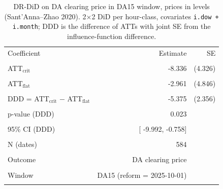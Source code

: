 \begin{table}[H]\centering\small
\caption{DR-DiD on DA clearing price in DA15 window, prices in levels (Sant'Anna--Zhao 2020). 2$\times$2 DiD per hour-class, covariates \texttt{i.dow + i.month}; DDD is the difference of ATTs with joint SE from the influence-function difference.}\label{tab:reform_csdid_da15_da}
\begin{tabular}{lrr}
\toprule
Coefficient & Estimate & SE \\\\
\midrule
ATT$_{\text{crit}}$ &  -8.336 & (4.326) \\\\
ATT$_{\text{flat}}$ &  -2.961 & (4.846) \\\\
DDD = ATT$_{\text{crit}}$ $-$ ATT$_{\text{flat}}$ &  -5.375 & (2.356) \\\\
\midrule
p-value (DDD)        & 0.023 & \\\\
95\% CI (DDD)        & [ -9.992,  -0.758] & \\\\
N (dates)            &   584 & \\\\
Outcome              & DA clearing price & \\\\
Window               & DA15 (reform = 2025-10-01) & \\\\
\bottomrule
\end{tabular}
\end{table}
